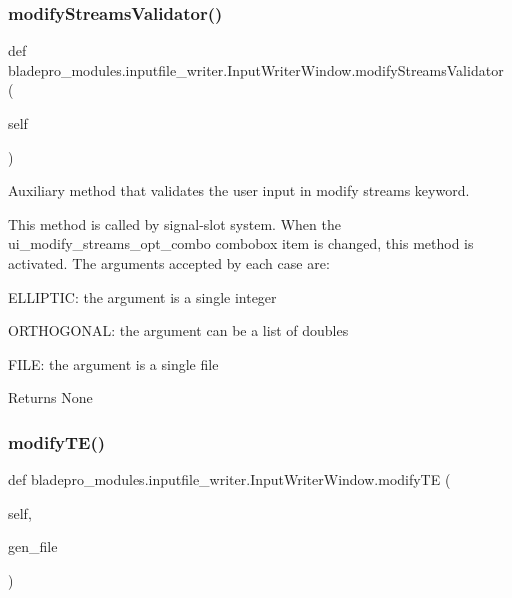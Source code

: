 \subsubsection{\texorpdfstring{modify\+Streams\+Validator()}{modifyStreamsValidator()}}
{\footnotesize\ttfamily def bladepro\+\_\+modules.\+inputfile\+\_\+writer.\+Input\+Writer\+Window.\+modify\+Streams\+Validator (\begin{DoxyParamCaption}\item[{}]{self }\end{DoxyParamCaption})}



Auxiliary method that validates the user input in modify streams keyword. 

This method is called by signal-\/slot system. When the ui\+\_\+modify\+\_\+streams\+\_\+opt\+\_\+combo combobox item is changed, this method is activated. The arguments accepted by each case are\+:

\begin{DoxyItemize}
\item {\ttfamily E\+L\+L\+I\+P\+T\+IC\+:} the argument is a single integer \item {\ttfamily O\+R\+T\+H\+O\+G\+O\+N\+AL\+:} the argument can be a list of doubles \item {\ttfamily F\+I\+LE\+:} the argument is a single file\end{DoxyItemize}
\begin{DoxyReturn}{Returns}
None 
\end{DoxyReturn}
\hypertarget{a00071_a52d4edd27f78b5559e6e3683c6adb3bc}{}\label{a00071_a52d4edd27f78b5559e6e3683c6adb3bc} 
\subsubsection{\texorpdfstring{modify\+T\+E()}{modifyTE()}}
{\footnotesize\ttfamily def bladepro\+\_\+modules.\+inputfile\+\_\+writer.\+Input\+Writer\+Window.\+modify\+TE (\begin{DoxyParamCaption}\item[{}]{self,  }\item[{}]{gen\+\_\+file }\end{DoxyParamCaption})}



